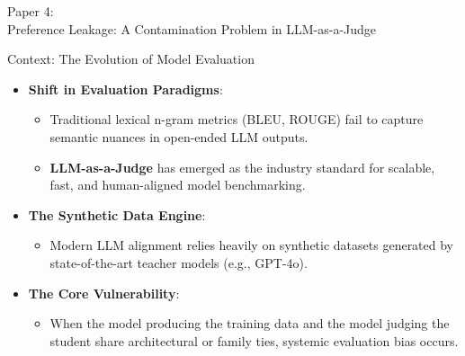 \documentclass[10pt]{beamer}
\begin{document}
	\begin{frame}[standout]
		\hypertarget{paper4}{}
		\Large Paper 4:\\Preference Leakage: A Contamination Problem in LLM-as-a-Judge
	\end{frame}
	
	\begin{frame}{Context: The Evolution of Model Evaluation}
		\begin{itemize}
			\item \textbf{Shift in Evaluation Paradigms}:
			\begin{itemize}
				\item Traditional lexical n-gram metrics (BLEU, ROUGE) fail to capture semantic nuances in open-ended LLM outputs.
				\item \textbf{LLM-as-a-Judge} has emerged as the industry standard for scalable, fast, and human-aligned model benchmarking.
			\end{itemize}
			\vspace{0.25cm}
			\item \textbf{The Synthetic Data Engine}:
			\begin{itemize}
				\item Modern LLM alignment relies heavily on synthetic datasets generated by state-of-the-art teacher models (e.g., GPT-4o).
			\end{itemize}
			\vspace{0.25cm}
			\item \textbf{The Core Vulnerability}:
			\begin{itemize}
				\item When the model producing the training data and the model judging the student share architectural or family ties, systemic evaluation bias occurs.
			\end{itemize}
		\end{itemize}
	\end{frame}
	
\end{document}
